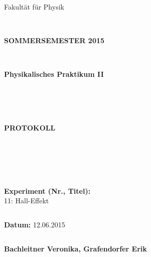 \documentclass[12pt,a4paper,twopage]{article}
\begin{document}
\thispagestyle{empty}
			\begin{center}
			\Large{Fakultät für Physik}\\
			\end{center}
\begin{verbatim}


\end{verbatim}
			\begin{center}
			\textbf{\LARGE SOMMERSEMESTER 2015}
			\end{center}
\begin{verbatim}


\end{verbatim}
			\begin{center}
			\textbf{\LARGE{Physikalisches Praktikum II}}
			\end{center}
\begin{verbatim}




\end{verbatim}

			\begin{center}
			\textbf{\LARGE{PROTOKOLL}}
			\end{center}
			
\begin{verbatim}





\end{verbatim}

			\begin{flushleft}
			\textbf{\Large{Experiment (Nr., Titel):}}\\
			\LARGE{11: Hall-Effekt}	
			\end{flushleft}

\begin{verbatim}

\end{verbatim}	
			\begin{flushleft}
			\textbf{\Large{Datum:}} \Large{12.06.2015}
			\end{flushleft}
			
\begin{verbatim}
\end{verbatim}
		\begin{flushleft}
			\textbf{\Large{Bachleitner Veronika, Grafendorfer Erik}} 
			\end{flushleft}
\end{document}
